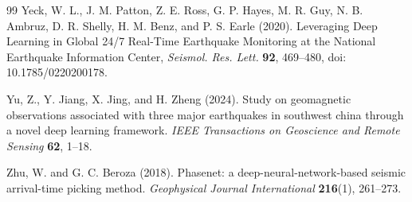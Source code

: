 \begin{thebibliography}{99}
Yeck, W. L., J. M. Patton, Z. E. Ross, G. P. Hayes, M. R. Guy, N. B. Ambruz, D. R. Shelly, H. M. Benz, and P. S. Earle (2020). Leveraging Deep Learning in Global 24/7 Real-Time Earthquake Monitoring at the National Earthquake Information Center, \textit{Seismol. Res. Lett.} \textbf{92}, 469--480, doi: 10.1785/0220200178.

Yu, Z., Y. Jiang, X. Jing, and H. Zheng (2024). Study on geomagnetic observations associated with three major earthquakes in southwest china through a novel deep learning framework. \textit{IEEE Transactions on Geoscience and Remote Sensing} \textbf{62}, 1--18.

Zhu, W. and G. C. Beroza (2018). Phasenet: a deep-neural-network-based seismic arrival-time picking method. \textit{Geophysical Journal International} \textbf{216}(1), 261--273.

\end{thebibliography}
